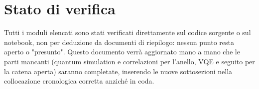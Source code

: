 \documentclass[11pt,a4paper]{article}
\begin{document}
\section{Stato di verifica}

Tutti i moduli elencati sono stati verificati direttamente sul codice
sorgente o sul notebook, non per deduzione da documenti di riepilogo:
nessun punto resta aperto o "presunto". Questo documento verrà aggiornato
mano a mano che le parti mancanti (quantum simulation e correlazioni per
l'anello, VQE e seguito per la catena aperta) saranno completate,
inserendo le nuove sottosezioni nella collocazione cronologica corretta
anziché in coda.
\end{document}
